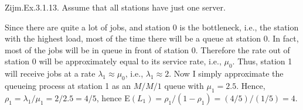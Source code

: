 \begin{exercise}
Zijm.Ex.3.1.13. Assume that all stations have just one server.
\begin{solution}
  Since there are quite a lot of jobs, and station 0 is the
  bottleneck, i.e., the station with the highest load, most of the
  time there will be a queue at station 0. In fact, most of the jobs
  will be in queue in front of station 0. Therefore the rate out of
  station 0 will be approximately equal to its service rate, i.e.,
  $\mu_0$. Thus, station 1 will receive jobs at a rate
  $\lambda_1\approx\mu_0$, i.e., $\lambda_1 \approx 2$. Now I simply
  approximate the queueing process at station 1 as an $M/M/1$ queue
  with $\mu_1=2.5$. Hence, $\rho_1 = \lambda_1/\mu_1=2/2.5 = 4/5$,
  hence E$(L_1) = \rho_1/(1-\rho_1) = (4/5)/(1/5) = 4$.
\end{solution}
\end{exercise}



